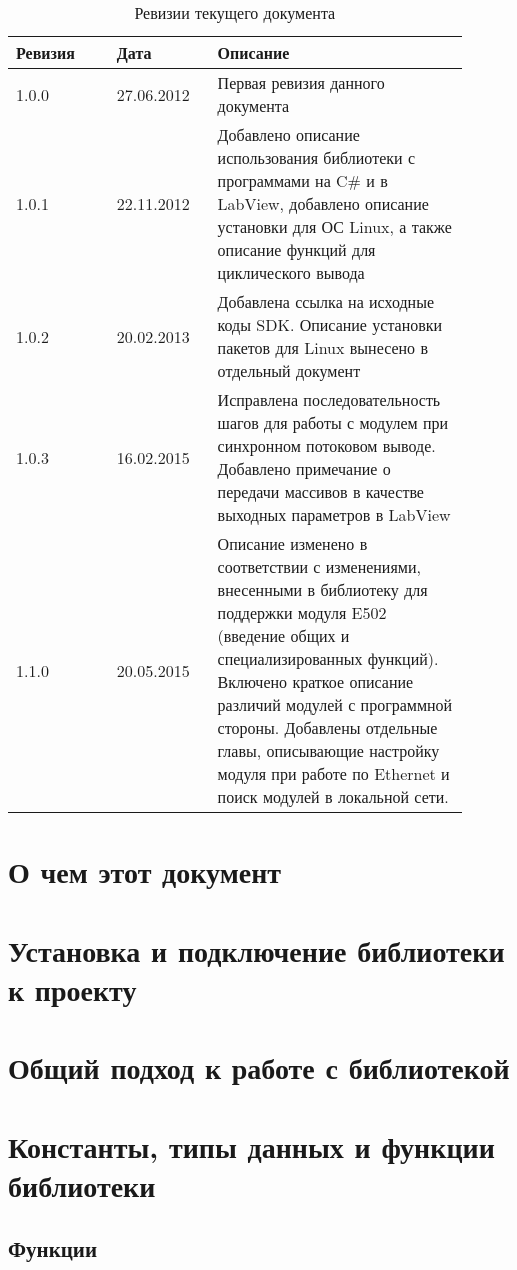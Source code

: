 \documentclass[12pt,a4paper,titlepage]{report}
\begin{document}
  
  \begin{longtable}{|m{0.2\linewidth}|m{0.2\linewidth}|m{0.5\linewidth}|}
  \caption{Ревизии текущего документа}\\\hline
  \textbf{Ревизия} & \textbf{Дата} & \textbf{Описание}\\\hline
  1.0.0            & 27.06.2012    & Первая ревизия данного документа \\\hline
  1.0.1            & 22.11.2012    & Добавлено описание использования библиотеки с программами на C\# и в LabView, добавлено описание установки для ОС Linux, а также описание функций для циклического вывода \\\hline
  1.0.2            & 20.02.2013    & Добавлена ссылка на исходные коды SDK. Описание установки пакетов для Linux вынесено в отдельный документ \\\hline
  1.0.3            & 16.02.2015    & Исправлена последовательность шагов для работы с модулем при синхронном потоковом выводе. Добавлено примечание о передачи массивов в качестве выходных параметров в LabView \\\hline
  1.1.0            & 20.05.2015    & Описание изменено в соответствии с изменениями, внесенными в библиотеку для поддержки модуля E502 (введение общих и специализированных функций). Включено краткое описание различий модулей с программной стороны. Добавлены отдельные главы, описывающие настройку модуля при работе по Ethernet и поиск модулей в локальной сети. \\\hline
  \end{longtable}
  \newpage  
  
  \tableofcontents
  

\chapter{О чем этот документ}

\chapter{Установка и подключение библиотеки к проекту}

\chapter{Общий подход к работе с библиотекой}


  
\chapter{Константы, типы данных и функции библиотеки}



%
%
%
\section{Функции}











\end{document}
